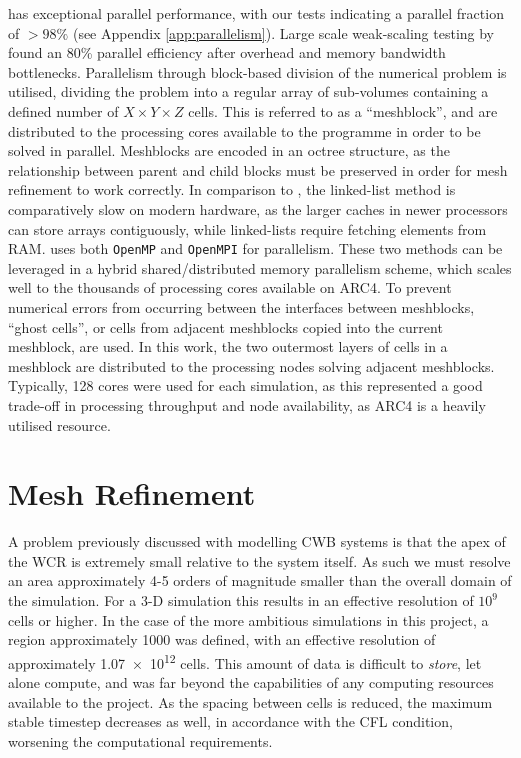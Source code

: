 
\athena{} has exceptional parallel performance, with our tests indicating a parallel fraction of $>98\%$ (see Appendix \ref{app:parallelism}).
Large scale weak-scaling testing by \textcite{stoneAthenaAdaptiveMesh2020} found an 80\% parallel efficiency after overhead and memory bandwidth bottlenecks.
Parallelism through block-based division of the numerical problem is utilised, dividing the problem into a regular array of sub-volumes containing a defined number of $X\times Y \times Z$ cells.
This is referred to as a ``meshblock'', and are distributed to the processing cores available to the programme in order to be solved in parallel.
Meshblocks are encoded in an octree structure, as the relationship between parent and child blocks must be preserved in order for mesh refinement to work correctly.
In comparison to \mg{}, the linked-list method is comparatively slow on modern hardware, as the larger caches in newer processors can store arrays contiguously, while linked-lists require fetching elements from RAM.
\athena{} uses both \texttt{OpenMP} and \texttt{OpenMPI} for parallelism.
These two methods can be leveraged in a hybrid shared/distributed memory parallelism scheme, which scales well to the thousands of processing cores available on ARC4.
To prevent numerical errors from occurring between the interfaces between meshblocks, ``ghost cells'', or cells from adjacent meshblocks copied into the current meshblock, are used.
In this work, the two outermost layers of cells in a meshblock are distributed to the processing nodes solving adjacent meshblocks.
Typically, \num{128} cores were used for each simulation, as this represented a good trade-off in processing throughput and node availability, as ARC4 is a heavily utilised resource.

\section{Mesh Refinement}
\label{sec:refinement}

A problem previously discussed with modelling CWB systems is that the apex of the WCR is extremely small relative to the system itself.
As such we must resolve an area approximately 4-5 orders of magnitude smaller than the overall domain of the simulation.
For a 3-D simulation this results in an effective resolution of $10^9$ cells or higher.
In the case of the more ambitious simulations in this project, a region approximately \SI{1000}{\au} was defined, with an effective resolution of approximately \num{1.07e12} cells.
This amount of data is difficult to \emph{store}, let alone compute, and was far beyond the capabilities of any computing resources available to the project.
As the spacing between cells is reduced, the maximum stable timestep decreases as well, in accordance with the CFL condition, worsening the computational requirements.

